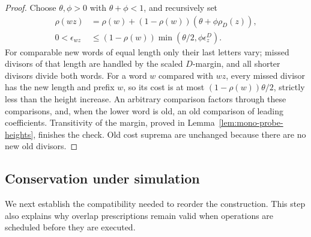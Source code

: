 \begin{proof}
Choose $\theta,\phi>0$ with $\theta+\phi<1$, and recursively set
\begin{equation}\label{eq:mono-merger-heights}
 \begin{split}
 \rho(wz)&=\rho(w)+(1-\rho(w))(\theta+\phi\rho_D(z)),\\
 0<\epsilon_{wz}&\leq
 (1-\rho(w))\min(\theta/2,\phi\epsilon^D_z).
 \end{split}
\end{equation}
For comparable new words of equal length only their last letters
vary; missed divisors of that length are handled by the scaled
$D$-margin, and all shorter divisors divide both words.  For a word
$w$ compared with $wz$, every missed divisor has the new length and
prefix $w$, so its cost is at most $(1-\rho(w))\theta/2$, strictly
less than the height increase.  An arbitrary comparison factors
through these comparisons, and, when the lower word is old, an old
comparison of leading coefficients.  Transitivity of the margin,
proved in Lemma~\ref{lem:mono-probe-heights}, finishes the check.
Old cost suprema are unchanged because there are no new old divisors.
\end{proof}

\subsection{Conservation under simulation}

We next establish the compatibility needed to reorder the construction.
This step also explains why overlap prescriptions remain valid when
operations are scheduled before they are executed.

